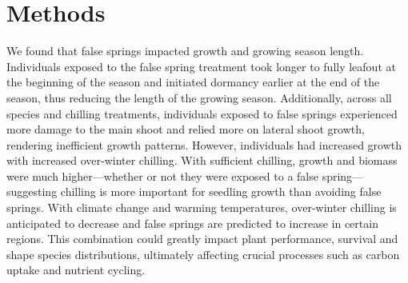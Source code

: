 \documentclass{article}\usepackage[]{graphicx}\usepackage[]{color}
\begin{document}




\section*{Methods}

     

We found that false springs impacted growth and growing season length. Individuals exposed to the false spring treatment took longer to fully leafout at the beginning of the season and initiated dormancy earlier at the end of the season, thus reducing the length of the growing season. Additionally, across all species and chilling treatments, individuals exposed to false springs experienced more damage to the main shoot and relied more on lateral shoot growth, rendering inefficient growth patterns. However, individuals had increased growth with increased over-winter chilling. With sufficient chilling, growth and biomass were much higher---whether or not they were exposed to a false spring---suggesting chilling is more important for seedling growth than avoiding false springs. With climate change and warming temperatures, over-winter chilling is anticipated to decrease and false springs are predicted to increase in certain regions. This combination could greatly impact plant performance, survival and shape species distributions, ultimately affecting crucial processes such as carbon uptake and nutrient cycling.
\end{document}

